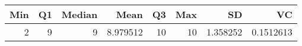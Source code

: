 
\begin{tabular}[t]{rrrrrrrr}
\toprule
Min & Q1 & Median & Mean & Q3 & Max & SD & VC\\
\midrule
2 & 9 & 9 & 8.979512 & 10 & 10 & 1.358252 & 0.1512613\\
\bottomrule
\end{tabular}